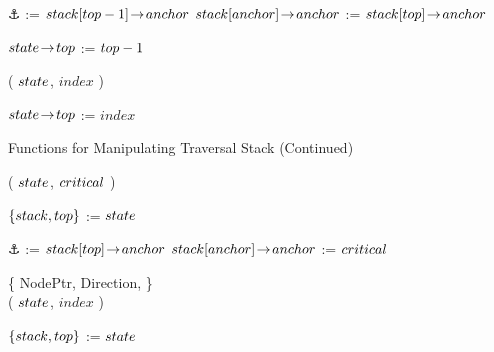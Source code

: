 \begin{limitscope}
\begin{algorithm}[tb]
{	 
	 $\anchor$ := $stack[top - 1] \!\rightarrow\! anchor$\;
	 \If{$\stack[\sTop] \rarrow \anchor$ $<$ $\stack[\anchor] \rarrow \anchor$}
	 {
	    $\stack[\anchor] \rarrow \anchor$ := $\stack[\sTop] \rarrow \anchor$\;  
	 }
	
	 $state \!\rightarrow\! top$ := $top - 1$\;
	 \OptReturn
	 \label{lin:local-remove|from|top:end}
	 	 
}
\BlankLine
\DontPrintSemicolon
\RemoveUntilCritical( $state$,  $index$ )\;
\PrintSemicolon
\label{lin:local-remove|until|critical:begin}
\Begin
{
  
   $state \!\rightarrow\! top$ := $index$\;
	 \OptReturn
	 \label{lin:local-remove|until|critical:end}

}
\end{algorithm}

\begin{algorithm}
\caption{Functions for Manipulating Traversal Stack (Continued)} 
\label{algo:local-stack|functions|2}
\DefineKeyWords
\DontPrintSemicolon
\RememberCritical( $state$,  $\critical$ )\;
\PrintSemicolon
\label{lin:local-remember|critical:begin}
\Begin
{
  
	 $\{  stack, top  \}$ := $state$\;
   	
	 $\anchor$ := $\stack[\sTop] \rarrow \anchor$\;
	 \If{$\critical$ $<$ $\stack[\anchor] \rarrow \anchor$}
	 {
	   $\stack[\anchor] \rarrow \anchor$ := $\critical$\;
	 }
	 \OptReturn
	 \label{lin:local-remember|critical:end}
}
\BlankLine
\DontPrintSemicolon
\{ NodePtr, \Enum Direction, \Integer \} \\
\qquad\qquad\qquad\qquad \GetFullEntry( $state$,  $index$ )\;
\PrintSemicolon
\label{lin:local-get|full|entry:begin}
\Begin
{
   
   $\{  stack, top  \}$ := $state$\;
	 
	
	 }
\end{algorithm}
\end{limitscope}
